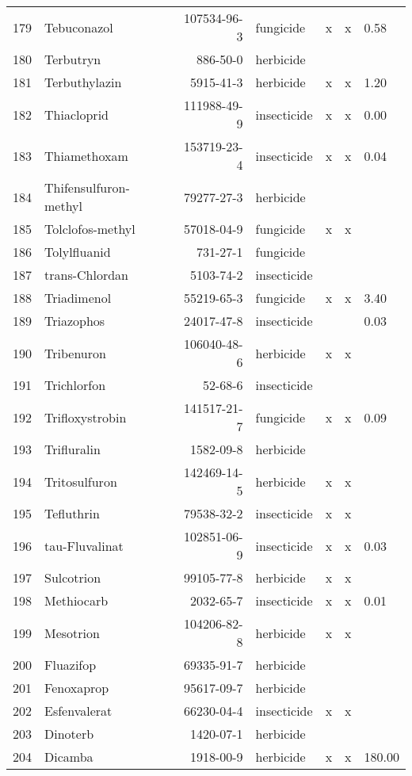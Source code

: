 \begin{longtable}{lp{3cm}rlp{0.5cm}p{0.5cm}p{1cm}}
  179 & Tebuconazol & 107534-96-3 & fungicide & x & x & 0.58 \\ 
  180 & Terbutryn & 886-50-0 & herbicide &  &  &  \\ 
  181 & Terbuthylazin & 5915-41-3 & herbicide & x & x & 1.20 \\ 
  182 & Thiacloprid & 111988-49-9 & insecticide & x & x & 0.00 \\ 
  183 & Thiamethoxam & 153719-23-4 & insecticide & x & x & 0.04 \\ 
  184 & Thifensulfuron-methyl & 79277-27-3 & herbicide &  &  &  \\ 
  185 & Tolclofos-methyl & 57018-04-9 & fungicide & x & x &  \\ 
  186 & Tolylfluanid & 731-27-1 & fungicide &  &  &  \\ 
  187 & trans-Chlordan & 5103-74-2 & insecticide &  &  &  \\ 
  188 & Triadimenol & 55219-65-3 & fungicide & x & x & 3.40 \\ 
  189 & Triazophos & 24017-47-8 & insecticide &  &  & 0.03 \\ 
  190 & Tribenuron & 106040-48-6 & herbicide & x & x &  \\ 
  191 & Trichlorfon & 52-68-6 & insecticide &  &  &  \\ 
  192 & Trifloxystrobin & 141517-21-7 & fungicide & x & x & 0.09 \\ 
  193 & Trifluralin & 1582-09-8 & herbicide &  &  &  \\ 
  194 & Tritosulfuron & 142469-14-5 & herbicide & x & x &  \\ 
  195 & Tefluthrin & 79538-32-2 & insecticide & x & x &  \\ 
  196 & tau-Fluvalinat & 102851-06-9 & insecticide & x & x & 0.03 \\ 
  197 & Sulcotrion & 99105-77-8 & herbicide & x & x &  \\ 
  198 & Methiocarb & 2032-65-7 & insecticide & x & x & 0.01 \\ 
  199 & Mesotrion & 104206-82-8 & herbicide & x & x &  \\ 
  200 & Fluazifop & 69335-91-7 & herbicide &  &  &  \\ 
  201 & Fenoxaprop & 95617-09-7 & herbicide &  &  &  \\ 
  202 & Esfenvalerat & 66230-04-4 & insecticide & x & x &  \\ 
  203 & Dinoterb & 1420-07-1 & herbicide &  &  &  \\ 
  204 & Dicamba & 1918-00-9 & herbicide & x & x & 180.00 \\ 

\end{longtable}
